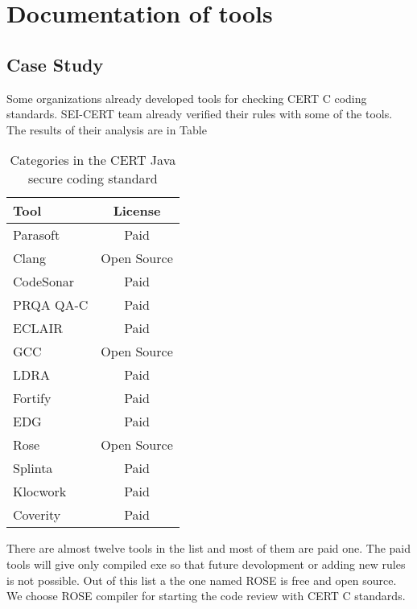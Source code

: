 \chapter{Documentation of tools}
\section{Case Study}
Some organizations already developed tools for checking CERT C coding standards.  SEI-CERT team  already verified their rules with some of the tools. The results of their analysis are in Table
\begin{table}[h!]
	\centering
	
	\label{tab:table1}
	\begin{tabular}{|l |c|}
		\hline
		\textbf{Tool} & \textbf{License}\\
		\hline
		Parasoft  & Paid\\
		\hline
	 Clang &   Open Source\\
	 \hline
	 
	 CodeSonar &  Paid\\
	 \hline
	 
	 PRQA QA-C &   Paid\\
	 \hline
	 
	 ECLAIR &   Paid\\
	 \hline
	 
	 GCC &   Open Source\\
	 \hline
	 
	 LDRA &   Paid\\
	 \hline
	 
	 Fortify &    Paid\\
	 \hline
	 
	 EDG &   Paid\\
	 \hline
	 
	 Rose &   Open Source\\
	 \hline
	 
	 Splinta &   Paid\\
	 \hline
	 
	 Klocwork &  Paid\\
	 \hline
	 
	 Coverity &   Paid\\
	 \hline
		
	\end{tabular}
	\caption{Categories in the CERT Java secure coding standard}
\end{table}




There are almost twelve tools in the list and most of them are paid one.  The paid tools will give only compiled exe so that future devolopment or adding new rules is not possible. Out of this list a the one named ROSE is free and open source. We choose ROSE compiler for starting the code review with CERT C standards.

